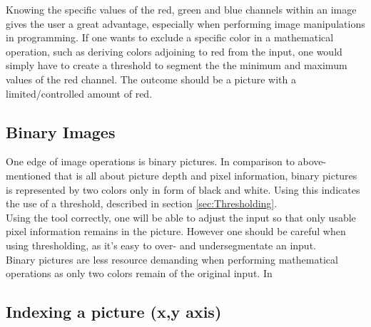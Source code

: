 Knowing the specific values of the red, green and blue channels within an image gives the user a great advantage, especially when performing image manipulations in programming. If one wants to exclude a specific color in a mathematical operation, such as deriving colors adjoining to red from the input, one would simply have to create a threshold to segment the the minimum and maximum values of the red channel. The outcome should be a picture with a limited/controlled amount of red. 

\subsection{Binary Images}
One edge of image operations is binary pictures. In comparison to above-mentioned that is all about picture depth and pixel information, binary pictures is represented by two colors only in form of black and white. Using this indicates the use of a threshold, described in section \ref{sec:Thresholding}.\\
Using the tool correctly, one will be able to adjust the input so that only usable pixel information remains in the picture. However one should be careful when using thresholding, as it's easy to over- and undersegmentate an input.\\
Binary pictures are less resource demanding when performing mathematical operations as only two colors remain of the original input. In 

\subsection{Indexing a picture (x,y axis)}


